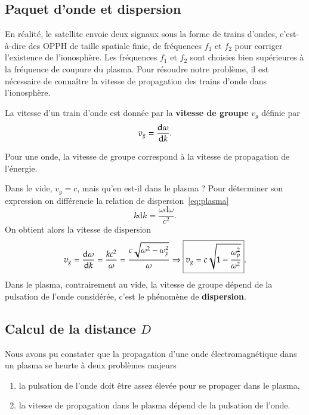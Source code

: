 \subsection{Paquet d'onde et dispersion}
En réalité, le satellite envoie deux signaux sous la forme de trains d'ondes, c'est-à-dire
des OPPH de taille spatiale finie, de fréquences $f_1$ et $f_2$ pour corriger
l'existence de l'ionosphère. Les fréquences $f_1$ et $f_2$ sont choisies bien supérieures
à la fréquence de coupure du plasma. Pour résoudre
notre problème, il est nécessaire de connaître la vitesse de propagation
des trains d'onde dans l'ionosphère.


La vitesse d'un train d'onde est donnée par la \textbf{vitesse de groupe} $v_g$
définie par 
\begin{equation*}
	v_g = \dfrac{\mathrm{d} \omega}{\mathrm{d} k}.
\end{equation*}

\begin{rem}
	Pour une onde, la vitesse de groupe correspond à la vitesse de 
	propagation de l'énergie.
\end{rem}

Dans le vide, $v_g = c$, mais qu'en est-il dans le plasma ? Pour déterminer son 
expression on différencie la relation de dispersion~\ref{eq:plasma}
\begin{equation*}
	k \mathrm{d}k = \dfrac{\omega \mathrm{d}\omega}{c^2}.
\end{equation*}
On obtient alors la vitesse de dispersion
\begin{equation*}
	v_g = \dfrac{\mathrm{d} \omega}{\mathrm{d} k} = \dfrac{k c^2}{\omega} = \dfrac{c \sqrt{\omega^2
	- \omega_p^2}}{\omega} \Rightarrow \boxed{v_g = c 
	\sqrt{1 - \dfrac{\omega_p^2}{\omega^2}}}.
\end{equation*}
Dans le plasma, contrairement au vide, la vitesse de groupe dépend de la pulsation de
l'onde considérée, c'est le phénomène de \textbf{dispersion}.

\subsection{Calcul de la distance $D$}
Nous avons pu constater que la propagation d'une onde électromagnétique dans 
un plasma se heurte à deux problèmes majeurs
\begin{enumerate}
	\item la pulsation de l'onde doit être assez élevée pour se propager
	  dans le plasma,
	\item la vitesse de propagation dans le plasma dépend de la pulsation de
	  l'onde.
\end{enumerate}


